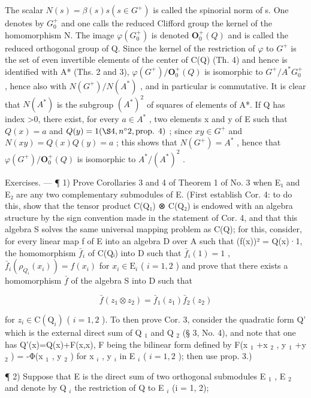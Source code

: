 The scalar \(N(s) = \beta(s)s (s \in G^{+})\) is called the spinorial norm of s. One denotes by \(G_{0}^{+}\) and one calls the reduced Clifford group the kernel of the homomorphism N. The image \(\varphi(G_{0}^{+})\) is denoted \(\mathbf{O}_{0}^{+}(Q)\) and is called the reduced orthogonal group of Q. Since the kernel of the restriction of \(\varphi\) to \(G^{+}\) is the set of even invertible elements of the center of C(Q) (Th. 4) and hence is identified with A* (Ths. 2 and 3), \(\varphi(G^{+})/\mathbf{O}_{0}^{+}(Q)\) is isomorphic to \(G^{+}/A^{*}G_{0}^{+}\) , hence also with \(N(G^{+})/N(A^{*})\) , and in particular is commutative. It is clear that \(N(A^{*})\) is the subgroup \((A^{*})^{2}\) of squares of elements of A*. If Q has index \textgreater0, there exist, for every \(a \in A^{*}\) , two elements x and y of E such that \(Q(x) = a\) and \(Q(y) = 1 (\S 4, n^{\circ} 2, \text{prop. } 4)\) ; since \(xy \in G^{+}\) and \(N(xy) = Q(x)Q(y) = a\) ; this shows that \(N(G^{+}) = A^{*}\) , hence that \(\varphi(G^{+})/\mathbf{O}_{0}^{+}(Q)\) is isomorphic to \(A^{*}/(A^{*})^{2}\) .

Exercises. --- ¶ 1) Prove Corollaries 3 and 4 of Theorem 1 of No. 3 when E₁ and E₂ are any two complementary submodules of E. (First establish Cor. 4: to do this, show that the tensor product C(Q₁) ⊗ C(Q₂) is endowed with an algebra structure by the sign convention made in the statement of Cor. 4, and that this algebra S solves the same universal mapping problem as C(Q); for this, consider, for every linear map f of E into an algebra D over A such that (f(x))² = Q(x)·1, the homomorphism \(\bar{f}_i\) of C(Qᵢ) into D such that \(\bar{f}_i(1) = 1\) , \(\bar{f}_i(\rho_{Q_i}(x_i)) = f(x_i)\) for \(x_i \in \mathrm{E}_i\) ( \(i = 1, 2\) ) and prove that there exists a homomorphism \(\bar{f}\) of the algebra S into D such that

\[
\bar {f} (z _ {1} \otimes z _ {2}) = \bar {f} _ {1} (z _ {1}) \bar {f} _ {2} (z _ {2})
\]

for \(z_{i}\in\mathrm{C}(\mathrm{Q}_{i})\) ( \(i=1,2\) ). To then prove Cor. 3, consider the quadratic form Q' which is the external direct sum of Q \(_{1}\) and Q \(_{2}\) (§ 3, No. 4), and note that one has Q'(x)=Q(x)+F(x,x), F being the bilinear form defined by F(x \(_{1}\) +x \(_{2}\) , y \(_{1}\) +y \(_{2}\) ) = -Φ(x \(_{1}\) , y \(_{2}\) ) for x \(_{i}\) , y \(_{i}\) in E \(_{i}\) ( \(i=1,2\) ); then use prop. 3.)

¶ 2) Suppose that E is the direct sum of two orthogonal submodules E \(_{1}\) , E \(_{2}\) and denote by Q \(_{i}\) the restriction of Q to E \(_{i}\) (i = 1, 2);

